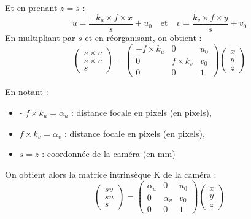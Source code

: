 \documentclass[12pt]{article}
\begin{document}
Et en prenant $z = s$ :
\begin{equation}
    u = \frac{- k_u \times f \times x}{s} + u_{0}
    \quad \text{et} \quad v = \frac{k_v \times f \times y}{s} + v_{0}
\end{equation}
En multipliant par $s$ et en réorganisant, on obtient :
\begin{equation}
    \begin{pmatrix}
    s \times u \\
    s \times v \\
    s
    \end{pmatrix} = 
    \begin{pmatrix}
    - f \times k_u & 0 & u_{0} \\
    0 & f \times k_v & v_{0} \\
    0 & 0 & 1
    \end{pmatrix}
    \begin{pmatrix}
    x \\
    y \\
    z
    \end{pmatrix}
\end{equation}

En notant :
\begin{itemize}
    \item - $f \times k_{u} = \alpha_u$ : distance focale en pixels (en pixels),
    \item $f \times k_{v} = \alpha_v$ : distance focale en pixels (en pixels),
    \item $s = z$ : coordonnée de la caméra (en mm)
\end{itemize}

On obtient alors la matrice intrinsèque K de la caméra :
\begin{equation}
    \begin{pmatrix}
    sv \\
    su \\
    s
    \end{pmatrix} = 
    \begin{pmatrix}
    \alpha_u & 0 & u_0 \\
    0 & \alpha_v & v_0 \\
    0 & 0 & 1
    \end{pmatrix}
    \begin{pmatrix}
    x \\
    y \\
    z
    \end{pmatrix}
\end{equation}
\end{document}

